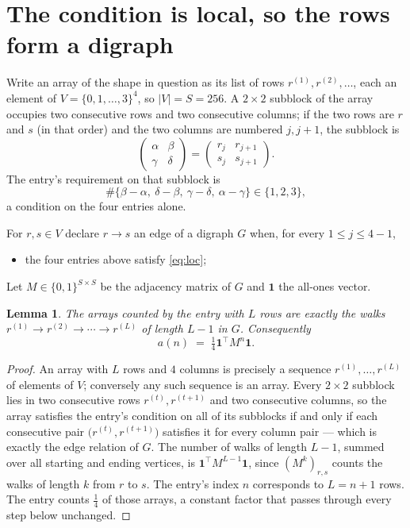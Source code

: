 \documentclass[11pt,a4paper]{article}
\theoremstyle{plain}
\newtheorem{lemma}[theorem]{Lemma}
\theoremstyle{definition}
\begin{document}
\section{The condition is local, so the rows form a digraph}

Write an array of the shape in question as its list of rows
$r^{(1)},r^{(2)},\dots$, each an element of
$V=\{0,1,\dots,3\}^{4}$, so $|V|=S=256$. A $2\times2$ subblock of the array
occupies two consecutive rows and two consecutive columns; if the two rows are $r$
and $s$ (in that order) and the two columns are numbered $j,j+1$,
the subblock is
\[
\begin{pmatrix}\alpha&\beta\\\gamma&\delta\end{pmatrix}=\begin{pmatrix}r_j&r_{j+1}\\s_j&s_{j+1}\end{pmatrix}.
\]
The entry's requirement on that subblock is
\begin{equation}\label{eq:loc}
\#\{\beta-\alpha,\ \delta-\beta,\ \gamma-\delta,\ \alpha-\gamma\}\in\{1,2,3\},
\end{equation}
a condition on the four entries alone.

For $r,s\in V$ declare $r\to s$ an edge of a digraph $G$ when, for every
$1\le j\le 4-1$,
\begin{itemize}
\item the four entries above satisfy \eqref{eq:loc};

\end{itemize}
Let $M\in\{0,1\}^{S\times S}$ be the adjacency matrix of $G$ and $\mathbf{1}$ the
all-ones vector.

\begin{lemma}\label{lem:walk}
The arrays counted by the entry with $L$ rows are exactly the walks
$r^{(1)}\to r^{(2)}\to\cdots\to r^{(L)}$ of length $L-1$ in $G$. Consequently
\[
a(n)\;=\;\tfrac1{4}\mathbf{1}^{\!\top}M^{n}\mathbf{1} .
\]
\end{lemma}

\begin{proof}
An array with $L$ rows and $4$ columns is precisely a sequence
$r^{(1)},\dots,r^{(L)}$ of elements of $V$; conversely any such sequence is an array.
Every $2\times2$ subblock lies in two consecutive rows $r^{(t)},r^{(t+1)}$ and two
consecutive columns, so the array satisfies the entry's condition on all of its subblocks
if and only if each consecutive pair $\bigl(r^{(t)},r^{(t+1)}\bigr)$ satisfies it for
every column pair --- which is exactly the edge relation of $G$. The number of walks of
length $L-1$, summed over all starting and ending vertices, is
$\mathbf{1}^{\!\top}M^{L-1}\mathbf{1}$, since $(M^{k})_{r,s}$ counts the walks of
length $k$ from $r$ to $s$. The entry's index $n$ corresponds to $L=n+1$ rows. The entry counts $\tfrac1{4}$ of those arrays, a constant factor that passes through every step below unchanged.
\end{proof}
\end{document}
